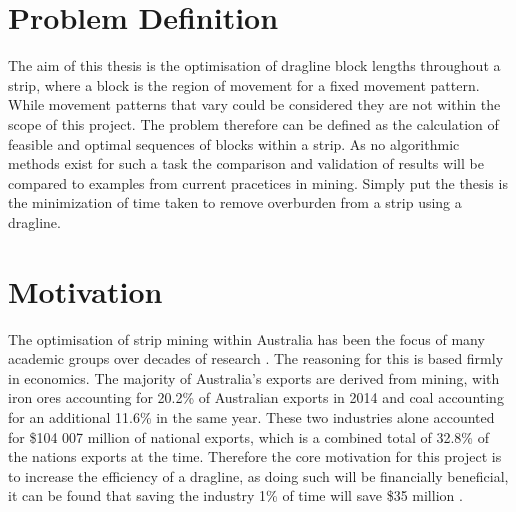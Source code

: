 \section{Problem Definition}
The aim of this thesis is the optimisation of dragline block lengths throughout a strip, where a block is the region of movement for a fixed movement pattern. While movement patterns that vary could be considered they are not within the scope of this project. The problem therefore can be defined as the calculation of feasible and optimal sequences of blocks within a strip. As no algorithmic methods exist for such a task the comparison and validation of results will be compared to examples from current pracetices in mining. Simply put the thesis is the minimization of time taken to remove overburden from a strip using a dragline. 



\section{Motivation}
The optimisation of strip mining within Australia has been the focus of many academic groups over decades of research \cite{DraglineDecade}. The reasoning for this is based firmly in economics. The majority of Australia's exports are derived from mining, with iron ores accounting for 20.2\% of Australian exports in 2014\cite{ExportStats} and coal accounting for an additional 11.6\% in the same year\cite{ExportStats}. These two industries alone accounted for \$104 007 million of national exports, \cite{ExportStats} which is a combined total of 32.8\% of the nations exports at the time. Therefore the core motivation for this project is to increase the efficiency of a dragline, as doing such will be financially beneficial,  it can be found that saving the industry 1\% of time will save \$35 million \cite{PacificCoal}.

